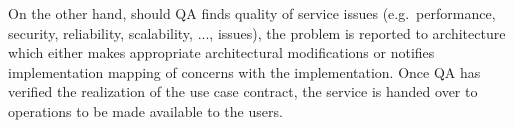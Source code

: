 On the other hand, should QA finds quality of service issues (e.g.\ performance, security, reliability, scalability, ..., issues), the problem is reported to architecture which either makes appropriate architectural modifications or notifies implementation mapping of concerns with the implementation. Once QA has verified the realization of the use case contract, the service is handed over to operations to be made available to the users.